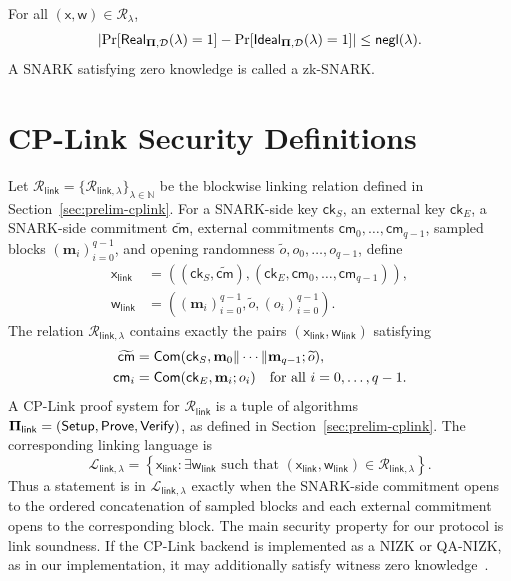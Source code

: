\documentclass[conference,compsoc]{IEEEtran}
\newcommand{\cm}{\textsf{cm}}
\newcommand{\ck}{\textsf{ck}}
\newcommand{\vect}{\mathbf}         %
\newcommand{\bPi}{{\bf \Pi}}
\newcommand{\setup}{{\sf Setup}}
\newcommand{\com}{{\sf Com}}
\newcommand{\prove}{{\sf Prove}}
\renewcommand{\verify}{{\sf Verify}}
\newcommand{\relation}{{\mathcal{R}}}
\renewcommand{\ck}{{\textsf{ck}}}
\newcommand{\stmt}{\mathsf{x}}      %
\newcommand{\wit}{\mathsf{w}}       %
\theoremstyle{plain}
\theoremstyle{definition}
\theoremstyle{remark}
\begin{document}
For all \((\stmt,\wit)\in\relation_\lambda\),
\[
\left|
  \Pr[\mathsf{Real}_{\bPi,\mathcal{D}}(\lambda)=1]
  -
  \Pr[\mathsf{Ideal}_{\bPi,\mathcal{D}}(\lambda)=1]
\right|
\le
\textsf{negl}(\lambda).
\]
A SNARK satisfying zero knowledge is called a zk-SNARK.

\section{CP-Link Security Definitions}
\label{app:cplink-security}

Let
\(\relation_{\mathsf{link}}
=\{\relation_{\mathsf{link},\lambda}\}_{\lambda\in\mathbb{N}}\)
be the blockwise linking relation defined in Section~\ref{sec:prelim-cplink}.
For a SNARK-side key \(\ck_S\), an external key \(\ck_E\), a SNARK-side
commitment \(\widetilde{\cm}\), external commitments
\(\cm_0,\ldots,\cm_{q-1}\), sampled blocks
\((\vect{m}_i)_{i=0}^{q-1}\), and opening randomness
\(\widetilde{o},o_0,\ldots,o_{q-1}\), define
\[
\begin{aligned}
\stmt_{\mathsf{link}}
&=
((\ck_S,\widetilde{\cm}),
(\ck_E,\cm_0,\ldots,\cm_{q-1})),\\
\wit_{\mathsf{link}}
&=
((\vect{m}_i)_{i=0}^{q-1},\widetilde{o},(o_i)_{i=0}^{q-1}).
\end{aligned}
\]
The relation \(\relation_{\mathsf{link},\lambda}\) contains exactly the pairs
\((\stmt_{\mathsf{link}},\wit_{\mathsf{link}})\) satisfying
\[
\begin{aligned}
\widetilde{\cm}
&=
\com(\ck_S,\vect{m}_0\|\cdots\|\vect{m}_{q-1};\widetilde{o}),\\
\cm_i
&=
\com(\ck_E,\vect{m}_i;o_i)
\quad \text{for all } i=0,\ldots,q-1.
\end{aligned}
\]
A CP-Link proof system for \(\relation_{\mathsf{link}}\) is a tuple of
algorithms
\(\bPi_{\mathsf{link}}=(\setup,\prove,\verify)\), as defined in
Section~\ref{sec:prelim-cplink}.  The corresponding linking language is
\[
  \mathcal{L}_{\mathsf{link},\lambda}
  =
  \left\{
    \stmt_{\mathsf{link}}
    :
    \exists \wit_{\mathsf{link}}
    \text{ such that }
    (\stmt_{\mathsf{link}},\wit_{\mathsf{link}})
    \in
    \relation_{\mathsf{link},\lambda}
  \right\}.
\]
Thus a statement is in \(\mathcal{L}_{\mathsf{link},\lambda}\) exactly when
the SNARK-side commitment opens to the ordered concatenation of sampled blocks
and each external commitment opens to the corresponding block.  The main
security property for our protocol is link soundness.  If the CP-Link backend
is implemented as a NIZK or QA-NIZK, as in our implementation, it may
additionally satisfy witness zero knowledge~\cite{legosnark,qa-nizk}. \\
\end{document}
